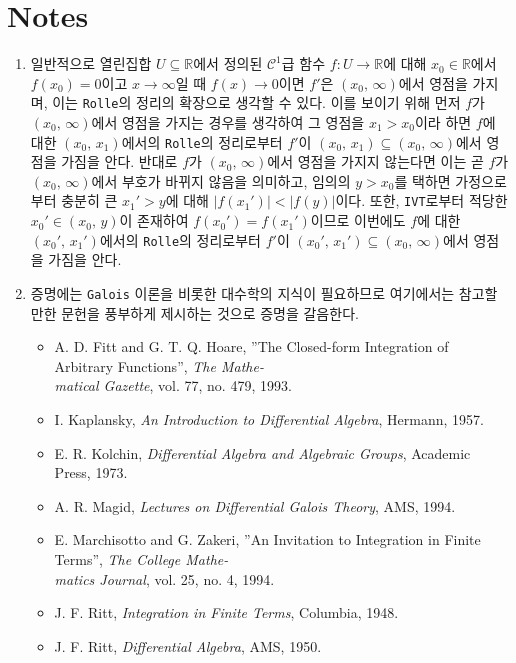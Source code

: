 \section*{Notes}
\footnotesize
\begin{enumerate}[label = \textsf{\textbf{\arabic*}}]
    \item 일반적으로 열린집합 $U\subseteq\mathbb{R}$에서 정의된 $\mathcal{C}^1$급 함수 $f:U\to\mathbb{R}$에 대해 $x_0\in\mathbb{R}$에서 $f(x_0)=0$이고 $x\to\infty$일 때 $f(x)\to0$이면 $f'$은 $(x_0,\,\infty)$에서 영점을 가지며, 이는 \texttt{Rolle}의 정리의 확장으로 생각할 수 있다. 이를 보이기 위해 먼저 $f$가 $(x_0,\,\infty)$에서 영점을 가지는 경우를 생각하여 그 영점을 $x_1>x_0$이라 하면 $f$에 대한 $(x_0,\,x_1)$에서의 \texttt{Rolle}의 정리로부터 $f'$이 $(x_0,\,x_1)\subseteq(x_0,\,\infty)$에서 영점을 가짐을 안다. 반대로 $f$가 $(x_0,\,\infty)$에서 영점을 가지지 않는다면 이는 곧 $f$가 $(x_0,\,\infty)$에서 부호가 바뀌지 않음을 의미하고, 임의의 $y>x_0$를 택하면 가정으로부터 충분히 큰 $x_1'>y$에 대해 $|f(x_1')|<|f(y)|$이다. 또한, \texttt{IVT}로부터 적당한 $x_0'\in(x_0,\,y)$이 존재하여 $f(x_0')=f(x_1')$이므로 이번에도 $f$에 대한 $(x_0',\,x_1')$에서의 \texttt{Rolle}의 정리로부터 $f'$이 $(x_0',\,x_1')\subseteq(x_0,\,\infty)$에서 영점을 가짐을 안다.
    \item 증명에는 \texttt{Galois} 이론을 비롯한 대수학의 지식이 필요하므로 여기에서는 참고할 만한 문헌을 풍부하게 제시하는 것으로 증명을 갈음한다.
    \begin{itemize}
        \ttfamily
        \item A. D. Fitt and G. T. Q. Hoare, ''The Closed-form Integration of Arbitrary Functions'', \textit{The Mathe-\\matical Gazette}, vol. 77, no. 479, 1993.
        \item I. Kaplansky, \textit{An Introduction to Differential Algebra}, Hermann, 1957.
        \item E. R. Kolchin, \textit{Differential Algebra and Algebraic Groups}, Academic Press, 1973.
        \item A. R. Magid, \textit{Lectures on Differential Galois Theory}, AMS, 1994.
        \item E. Marchisotto and G. Zakeri, ''An Invitation to Integration in Finite Terms'', \textit{The College Mathe-\\matics Journal}, vol. 25, no. 4, 1994.
        \item J. F. Ritt, \textit{Integration in Finite Terms}, Columbia, 1948.
        \item J. F. Ritt, \textit{Differential Algebra}, AMS, 1950.

\end{itemize}
\end{enumerate}
